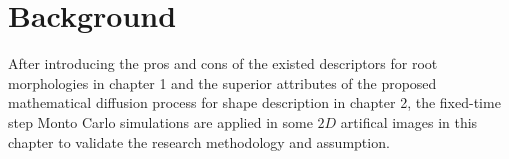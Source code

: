 \section{Background}

After introducing the pros and cons of the existed descriptors for root morphologies in chapter 1 and the superior attributes of the proposed mathematical diffusion process for shape description in chapter 2, the fixed-time step Monto Carlo simulations are applied in some $2D$ artifical images in this chapter to validate the research methodology and assumption. 
